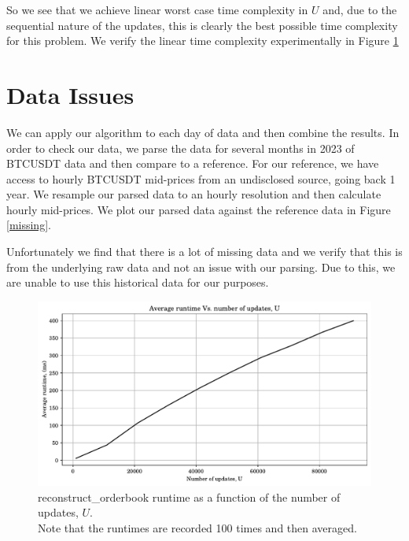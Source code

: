 So we see that we achieve linear worst case time complexity in $U$ and, due to the
sequential nature of the updates, this is clearly the best possible time complexity for 
this problem. We verify the linear time complexity experimentally in Figure \ref{complexity}


\section{Data Issues}

We can apply our algorithm to each day of data and then combine the results.
In order to check our data, we parse the data for several months in 2023 of BTCUSDT data 
and then compare to a reference.
For our reference, we have access to hourly BTCUSDT mid-prices from an undisclosed source,
going back 1 year.
We resample our parsed data to an hourly resolution and then calculate hourly mid-prices.
We plot our parsed data against the reference data in Figure \ref{missing}.

Unfortunately we find that there is a lot of missing data and we verify that this
is from the underlying raw data and not an issue with our parsing.
Due to this, we are unable to use this historical data for our purposes.

\begin{figure}[htpb]
    \centering
    \includegraphics[width=1.0\textwidth]{./images/complexity.pdf}
    \caption{reconstruct\_orderbook runtime as a function of the number of updates, $U$.\\ Note that the runtimes are recorded 100 times and then averaged.}
    \label{complexity}
\end{figure}

